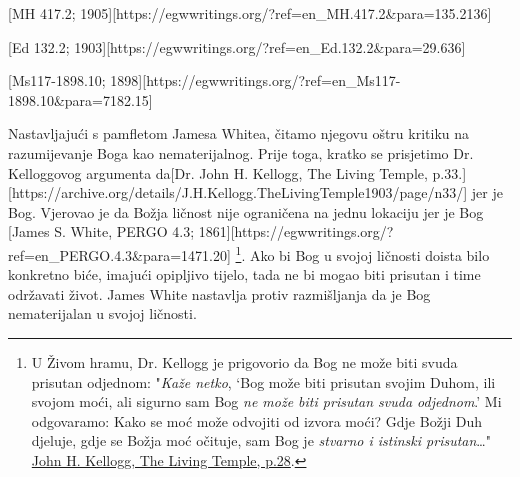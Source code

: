 [MH 417.2; 1905][https://egwwritings.org/?ref=en\_MH.417.2&para=135.2136]

[Ed 132.2; 1903][https://egwwritings.org/?ref=en\_Ed.132.2&para=29.636]

[Ms117-1898.10; 1898][https://egwwritings.org/?ref=en\_Ms117-1898.10&para=7182.15]

Nastavljajući s pamfletom Jamesa Whitea, čitamo njegovu oštru kritiku na razumijevanje Boga kao nematerijalnog. Prije toga, kratko se prisjetimo Dr. Kelloggovog argumenta da[Dr. John H. Kellogg, The Living Temple, p.33.][https://archive.org/details/J.H.Kellogg.TheLivingTemple1903/page/n33/] jer je Bog. Vjerovao je da Božja ličnost nije ograničena na jednu lokaciju jer je Bog [James S. White, PERGO 4.3; 1861][https://egwwritings.org/?ref=en\_PERGO.4.3&para=1471.20] \footnote{U Živom hramu, Dr. Kellogg je prigovorio da Bog ne može biti svuda prisutan odjednom: "\textit{Kaže netko}, ‘Bog može biti prisutan svojim Duhom, ili svojom moći, ali sigurno sam Bog \textit{ne može biti prisutan svuda odjednom}.’ Mi odgovaramo: Kako se moć može odvojiti od izvora moći? Gdje Božji Duh djeluje, gdje se Božja moć očituje, sam Bog je \textit{stvarno i istinski prisutan}…" \href{https://archive.org/details/J.H.Kellogg.TheLivingTemple1903/page/n29/}{John H. Kellogg, The Living Temple, p.28}.}. Ako bi Bog u svojoj ličnosti doista bilo konkretno biće, imajući opipljivo tijelo, tada ne bi mogao biti prisutan  i time održavati život. James White nastavlja protiv razmišljanja da je Bog nematerijalan u svojoj ličnosti.

